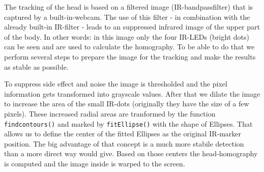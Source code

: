 The tracking of the head is based on a filtered image (IR-bandpassfilter) that is captured by a built-in-webcam. The use of this filter - in combination with the already built-in IR-filter - leads to an suppressed infrared image of the upper part of the body. 
In other words: in this image only the four IR-LEDs (bright dots) can be seen and are used to calculate the homography. 
To be able to do that we perform several steps to prepare the image for the tracking and make the results as stable as possible.

To suppress side effect and noise the image is thresholded and the pixel information gets transformed into grayscale values. 
After that we dilate the image to increase the area of the small IR-dots (originally they have the size of a few pixels). 
These increased radial areas are tranformed by the function \texttt{findcontours()} and marked by \texttt{fitEllipse()} with the shape of Ellipses. 
That allows us to define the center of the fitted Ellipses as the original IR-marker position. 
The big advantage of that concept is a much more stabile detection than a more direct way would give.
Based on those centers the head-homography is computed and the image inside is warped to the screen.
 
